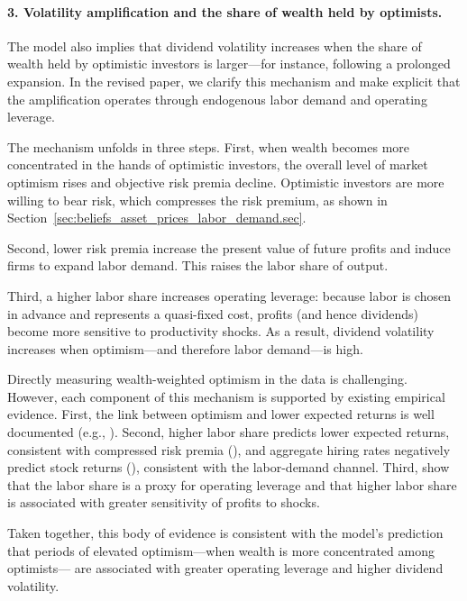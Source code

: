 \documentclass[12pt,a4paper]{article}
\begin{document}
    \paragraph{3. Volatility amplification and the share of wealth held by optimists.}

    The model also implies that dividend volatility increases when the share of wealth
    held by optimistic investors is larger—for instance, following a prolonged expansion.
    In the revised paper, we clarify this mechanism and make explicit that the amplification
    operates through endogenous labor demand and operating leverage.
    
    The mechanism unfolds in three steps.
    First, when wealth becomes more concentrated in the hands of optimistic investors,
    the overall level of market optimism rises and objective risk premia decline.
    Optimistic investors are more willing to bear risk, which compresses the risk premium,
    as shown in Section~\ref{sec:beliefs_asset_prices_labor_demand.sec}.
    
    Second, lower risk premia increase the present value of future profits and induce firms
    to expand labor demand.
    This raises the labor share of output.
    
    Third, a higher labor share increases operating leverage:
    because labor is chosen in advance and represents a quasi-fixed cost,
    profits (and hence dividends) become more sensitive to productivity shocks.
    As a result, dividend volatility increases when optimism—and therefore labor demand—is high.
    
    Directly measuring wealth-weighted optimism in the data is challenging.
    However, each component of this mechanism is supported by existing empirical evidence.
    First, the link between optimism and lower expected returns is well documented
    (e.g., \citealt{de_la_o_subjective_2021}).
    Second, higher labor share predicts lower expected returns,
    consistent with compressed risk premia (\citealt{santos2006labor}),
    and aggregate hiring rates negatively predict stock returns (\citealt{belo2023drives}),
    consistent with the labor-demand channel.
    Third, \citet{donangelo2019cross} show that the labor share is a proxy for operating leverage
    and that higher labor share is associated with greater sensitivity of profits to shocks.
    
    Taken together, this body of evidence is consistent with the model’s prediction
    that periods of elevated optimism—when wealth is more concentrated among optimists—
    are associated with greater operating leverage and higher dividend volatility.
\end{document}
